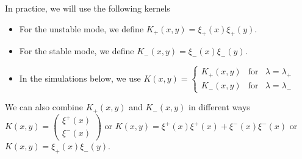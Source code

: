 \documentclass[11pt]{article}
\theoremstyle{plain}
\def\[{\begin{equation}}
\def\]{\end{equation}}
\begin{document}
In practice, we will use the following kernels
\begin{itemize}
    \item For the unstable mode, we  define $K_+(x,y)=\xi_+(x)\xi_+(y)$.
    \item For the stable mode, we  define
$K_-(x,y)=\xi_-(x)\xi_-(y)$.
\item In the simulations below, we use
$K(x,y)=\left\{\begin{array}{ccc}
     K_+(x,y)& \mbox{for} & \lambda=\lambda_+\\
     K_-(x,y)& \mbox{for} & \lambda=\lambda_-
\end{array}  \right. $

\end{itemize}
 We can also combine $ K_+(x,y)$ and $K_-(x,y)$  in different ways 
$K(x,y)=\left(\begin{array}{c}
     \xi^+(x) \\
     \xi^-(x) 
\end{array} \right)$
or $K(x,y)=\xi^+(x)\xi^+(x)+\xi^-(x)\xi^-(x)$ or $K(x,y)=\xi_+(x)\xi_-(y)$. 





\end{document}
